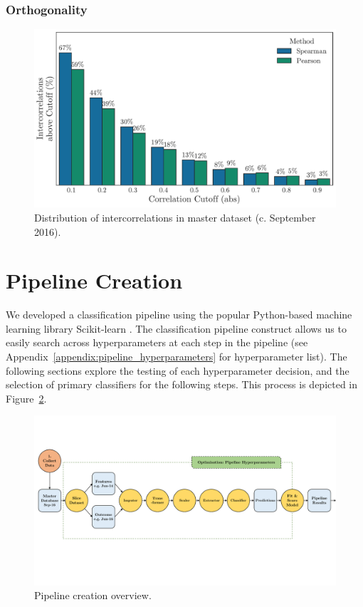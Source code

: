 \documentclass[../thesis/thesis.tex]{subfiles}
\begin{document}
\subsubsection{Orthogonality}


\begin{figure}[!htb]
    \centering
    \includegraphics[width=\textwidth]{../figures/design/orthogonality}
    \caption{Distribution of intercorrelations in master dataset (c. September 2016).}
    \label{fig:design:orthogonality}
\end{figure}

\section{Pipeline Creation}

We developed a classification pipeline using the popular Python-based machine learning library Scikit-learn \cite{pedregosa2011}. The classification pipeline construct allows us to easily search across hyperparameters at each step in the pipeline (see Appendix~\ref{appendix:pipeline_hyperparameters} for hyperparameter list). The following sections explore the testing of each hyperparameter decision, and the selection of primary classifiers for the following steps. This process is depicted in Figure~\ref{fig:design:pipeline_creation}.

\begin{figure}[!htb]
    \centering
    \includegraphics[width=\textwidth]{../figures/design/pipeline_creation}
    \caption{Pipeline creation overview.}
    \label{fig:design:pipeline_creation}
\end{figure}
\end{document}
